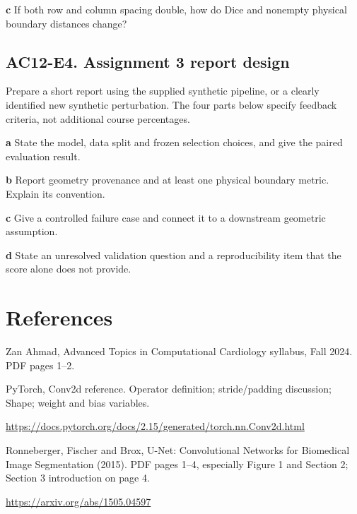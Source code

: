 \documentclass[11pt,letterpaper]{article}
\theoremstyle{definition}\newtheorem{definition}{Definition}\newtheorem{example}{Example}
\numberwithin{equation}{section}
\begin{document}
\textbf{c} If both row and column spacing double, how do Dice and nonempty physical boundary distances change?

\par\noindent\begin{minipage}{\linewidth}
\subsection*{AC12-E4. Assignment 3 report design}
Prepare a short report using the supplied synthetic pipeline, or a clearly identified new synthetic perturbation. The four parts below specify feedback criteria, not additional course percentages.

\textbf{a} State the model, data split and frozen selection choices, and give the paired evaluation result.

\end{minipage}\par\medskip
\textbf{b} Report geometry provenance and at least one physical boundary metric. Explain its convention.

\textbf{c} Give a controlled failure case and connect it to a downstream geometric assumption.

\textbf{d} State an unresolved validation question and a reproducibility item that the score alone does not provide.

\section*{References}
\noindent\begin{minipage}{\linewidth}
Zan Ahmad, Advanced Topics in Computational Cardiology syllabus, Fall 2024. PDF pages 1--2.

\end{minipage}\par\medskip
\noindent\begin{minipage}{\linewidth}
PyTorch, Conv2d reference. Operator definition; stride/padding discussion; Shape; weight and bias variables.

\url{https://docs.pytorch.org/docs/2.15/generated/torch.nn.Conv2d.html}
\end{minipage}\par\medskip
\noindent\begin{minipage}{\linewidth}
Ronneberger, Fischer and Brox, U-Net: Convolutional Networks for Biomedical Image Segmentation (2015). PDF pages 1--4, especially Figure 1 and Section 2; Section 3 introduction on page 4.

\url{https://arxiv.org/abs/1505.04597}
\end{minipage}\par\medskip
\end{document}
